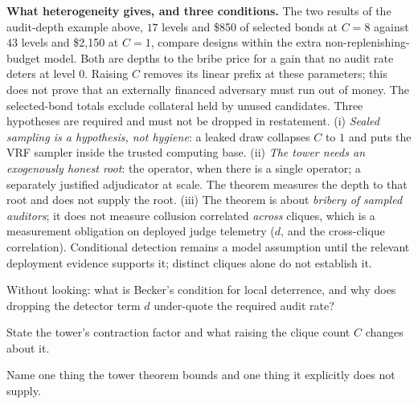 \documentclass[11pt,a4paper]{article}
\theoremstyle{definition}
\begin{document}


\noindent\textbf{What heterogeneity gives, and three conditions.} The two
results of the audit-depth example above, $17$ levels and \$850 of selected
bonds at $C=8$ against $43$ levels and \$2{,}150 at $C=1$, compare designs
within the extra non-replenishing-budget model. Both are depths to the bribe
price for a gain that no audit rate deters at level 0. Raising $C$ removes its linear prefix at these parameters; this does not prove that an externally financed adversary must run out of money. The selected-bond totals exclude collateral held by unused candidates. Three hypotheses are required and must not be dropped in
restatement. (i) \emph{Sealed sampling is a hypothesis, not hygiene}: a leaked draw
collapses $C$ to $1$ and puts the VRF sampler inside the trusted computing base.
(ii) \emph{The tower needs an exogenously honest root}: the operator, when there is a
single operator; a separately justified adjudicator at scale. The theorem measures the depth to
that root and does not supply the root. (iii) The theorem is about
\emph{bribery of sampled auditors}; it does not measure collusion correlated
\emph{across} cliques, which is a
measurement obligation on deployed judge telemetry ($d$, and the cross-clique
correlation). Conditional detection remains a model assumption until the relevant
deployment evidence supports it; distinct cliques alone do not establish it.


\pdexercisepointer*{\ref{ex:stp-grading-oracle-hole}}{\ref{ex:stp-tower-amortization}}{\pageref{ex:stp-grading-oracle-hole}}

\begin{pdrecitation}
\item Without looking: what is Becker's condition for local deterrence, and
why does dropping the detector term $d$ under-quote the required audit rate?
\item State the tower's contraction factor and what raising the clique count
$C$ changes about it.
\item Name one thing the tower theorem bounds and one thing it explicitly
does not supply.
\end{pdrecitation}

\end{document}
